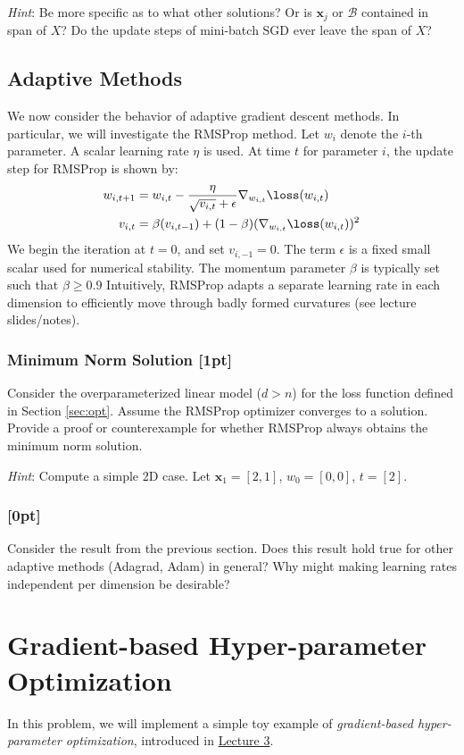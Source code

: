 {\it Hint}: Be more specific as to what other solutions? Or is $\mathbf{x}_j$  or $\mathcal{B}$ contained in span of $X$? Do the update steps of mini-batch SGD ever leave the span of $X$?

\subsection{Adaptive Methods}
We now consider the behavior of adaptive gradient descent methods. In particular, we will investigate the RMSProp method. Let $w_i$ denote the $i$-th parameter. A scalar learning rate $\eta$ is used. At time $t$ for parameter $i$, the update step for RMSProp is shown by:
\begin{align}
    w_{i, t+1} &= w_{i, t} - \frac{\eta}{\sqrt{v_{i, t}} + \epsilon} \nabla_{w_{i,t}} \loss (w_{i, t}) \\
    v_{i, t} &= \beta(v_{i, t-1}) + (1-\beta) (\nabla_{w_{i,t}} \loss (w_{i,t}))^2
    \label{eq:RMSProp}
\end{align}
We begin the iteration at $t=0$, and set $v_{i,-1} = 0$. The term $\epsilon$ is a fixed small scalar used for numerical stability. The momentum parameter $\beta$ is typically set such that $ \beta \geq 0.9$ Intuitively, RMSProp adapts a separate learning rate in each dimension to efficiently move through badly formed curvatures (see lecture slides/notes). 

\subsubsection{Minimum Norm Solution {\color{blue}[1pt]} \LI}
Consider the overparameterized linear model ($d>n$) for the loss function defined in Section \ref{sec:opt}. Assume the RMSProp optimizer converges to a solution. Provide a proof or counterexample for whether RMSProp always obtains the minimum norm solution.

{\it Hint}: Compute a simple 2D case. Let $\mathbf{x}_1 = [2, 1]$, $w_0 = [0,0]$, $t = [2]$.

\subsubsection{[0pt] \LI}
Consider the result from the previous section. Does this result hold true for other adaptive methods (Adagrad, Adam) in general? Why might making learning rates independent per dimension be desirable?

\section {Gradient-based Hyper-parameter Optimization}
    In this problem, we will implement a simple toy example of {\it gradient-based hyper-parameter optimization}, introduced in \href{https://uoft-csc413.github.io/2023/assets/slides/lec03.pdf}{Lecture 3}. 
    
